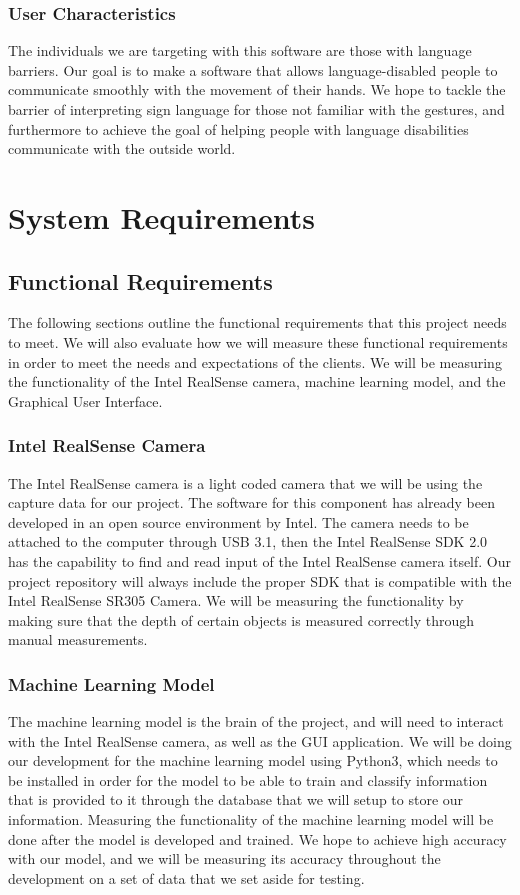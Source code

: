 \documentclass[onecolumn, draftclsnofoot,10pt, compsoc]{IEEEtran}
\begin{document}
\subsubsection{User Characteristics}
The individuals we are targeting with this software are those with language barriers. Our goal is to make a software that allows language-disabled people to communicate smoothly with the movement of their hands. We hope to tackle the barrier of interpreting sign language for those not familiar with the gestures, and furthermore to achieve the goal of helping people with language disabilities communicate with the outside world.



\section{System Requirements}

\subsection{Functional Requirements}
The following sections outline the functional requirements that this project needs to meet. We will also evaluate how we will measure these functional requirements in order to meet the needs and expectations of the clients. We will be measuring the functionality of the Intel RealSense camera, machine learning model, and the Graphical User Interface.

\subsubsection{Intel RealSense Camera}
The Intel RealSense camera is a light coded camera that we will be using the capture data for our project. The software for this component has already been developed in an open source environment by Intel. The camera needs to be attached to the computer through USB 3.1, then the Intel RealSense SDK 2.0 has the capability to find and read input of the Intel RealSense camera itself. Our project repository will always include the proper SDK that is compatible with the Intel RealSense SR305 Camera. We will be measuring the functionality by making sure that the depth of certain objects is measured correctly through manual measurements.

\subsubsection{Machine Learning Model}
The machine learning model is the brain of the project, and will need to interact with the Intel RealSense camera, as well as the GUI application. We will be doing our development for the machine learning model using Python3, which needs to be installed in order for the model to be able to train and classify information that is provided to it through the database that we will setup to store our information. Measuring the functionality of the machine learning model will be done after the model is developed and trained. We hope to achieve high accuracy with our model, and we will be measuring its accuracy throughout the development on a set of data that we set aside for testing.
\end{document}
